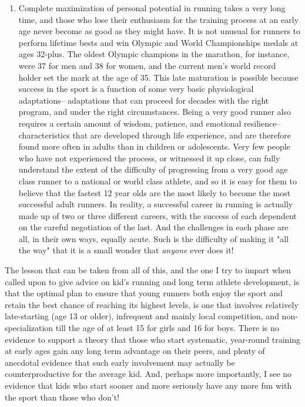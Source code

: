 \begin{enumerate}
    \item Complete maximization of personal potential in running takes a very long time, and those who lose their enthusiasm for the training process at an early age never become as good as they might have. It is not unusual for runners to perform lifetime bests and win Olympic and World Championships medals at ages 32-plus. The oldest Olympic champions in the marathon, for instance, were 37 for men and 38 for women, and the current men's world record holder set the mark at the age of 35. This late maturation is possible because success in the sport is a function of some very basic physiological adaptations-- adaptations that can proceed for decades with the right program, and under the right circumstances. Being a very good runner also requires a certain amount of wisdom, patience, and emotional resilience-- characteristics that are developed through life experience, and are therefore found more often in adults than in children or adolescents. Very few people who have not experienced the process, or witnessed it up close, can fully understand the extent of the difficulty of progressing from a very good age class runner to a national or world class athlete, and so it is easy for them to believe that the fastest 12 year olds are the most likely to become the most successful adult runners. In reality, a successful career in running is actually made up of two or three different careers, with the success of each dependent on the careful negotiation of the last. And the challenges in each phase are all, in their own ways, equally acute. Such is the difficulty of making it "all the way" that it is a small wonder that \textit{anyone} ever does it!

\end{enumerate}

The lesson that can be taken from all of this, and the one I try to impart when called upon to give advice on kid's running and long term athlete development, is that the optimal plan to ensure that young runners both enjoy the sport and retain the best chance of reaching its highest levels, is one that involves relatively late-starting (age 13 or older), infrequent and mainly local competition, and non-specialization till the age of at least 15 for girls and 16 for boys. There is no evidence to support a theory that those who start systematic, year-round training at early ages gain any long term advantage on their peers, and plenty of anecdotal evidence that such early involvement may actually be counterproductive for the average kid. And, perhaps more importantly, I see no evidence that kids who start sooner and more seriously have any more fun with the sport than those who don't!

